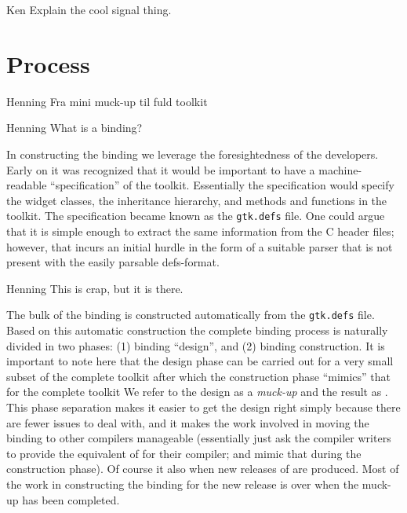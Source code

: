 \documentclass[workingdraft,endnotes]{usetex-v1}
\begin{document}
\begin{ednote}{Ken}
  Explain the cool signal thing.
\end{ednote}

\section{Process}
\label{sec:process}

\begin{ednote}{Henning}
  Fra mini muck-up til fuld toolkit
\end{ednote}

\begin{ednote}{Henning}
  What is a binding?
\end{ednote}

In constructing the \mgtk binding we leverage the foresightedness of
the \gtk developers. Early on it was recognized that it would be
important to have a machine-readable ``specification'' of the toolkit.
Essentially the specification would specify the widget classes, the
inheritance hierarchy, and methods and functions in the toolkit. The
specification became known as the \texttt{gtk.defs} file. One could
argue that it is simple enough to extract the same information from
the C header files; however, that incurs an initial hurdle in the
form of a suitable parser that is not present with the easily parsable
defs-format.

\begin{ednote}{Henning} This is crap, but it is there. \end{ednote}

The bulk of the \mgtk binding is constructed automatically from the
\texttt{gtk.defs} file. Based on this automatic construction the
complete binding process is naturally divided in two phases: (1)
binding ``design'', and (2) binding construction. It is important to
note here that the design phase can be carried out for a very small
subset of the complete toolkit after which the construction phase
``mimics'' that for the complete toolkit We refer to the design as a
\emph{muck-up} and the result as \minimgtk. This phase separation
makes it easier to get the design right simply because there are fewer
issues to deal with, and it makes the work involved in moving the
binding to other \sml compilers manageable (essentially just ask the
compiler writers to provide the equivalent of \minimgtk for their
compiler; and mimic that during the construction phase). Of course it
also when new releases of \gtk are produced. Most of the work in
constructing the binding for the new release is over when the muck-up
has been completed.
\end{document}
